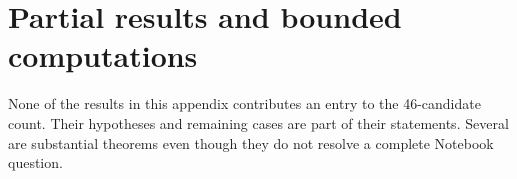 \section{Partial results and bounded computations}
\label{app:partials}

None of the results in this appendix contributes an entry to the
46-candidate count. Their hypotheses and remaining cases are part of
their statements. Several are substantial theorems even though they
do not resolve a complete Notebook question.





